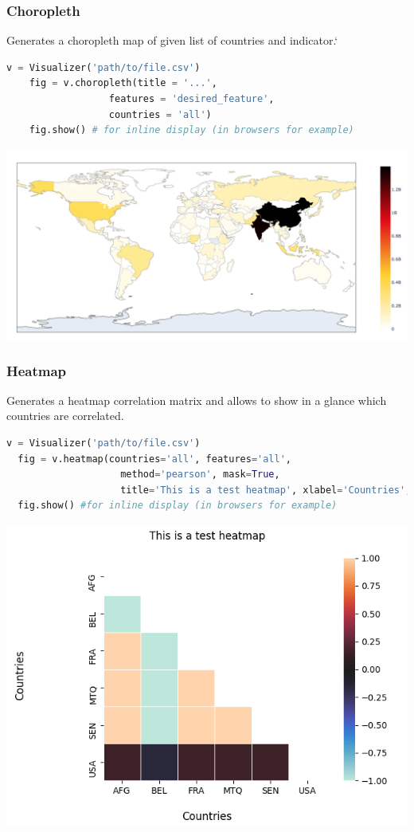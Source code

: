 \begin{frame}[fragile,shrink=30]
   \frametitle{Choropleth}
   Generates a choropleth map of given list of countries and indicator.`
   \begin{lstlisting}[language=Python]
    v = Visualizer('path/to/file.csv')
    fig = v.choropleth(title = '...',
                  features = 'desired_feature',
                  countries = 'all')
    fig.show() # for inline display (in browsers for example)
    \end{lstlisting}
    \begin{center}
        \includegraphics[scale=0.4]{beamer/inc/graphics/choropleth.png} 
    \end{center}
\end{frame}

\begin{frame}[fragile,shrink=30]
  \frametitle{Heatmap}
  Generates a heatmap correlation matrix and allows to show in a glance which countries are correlated.
  \begin{lstlisting}[language=Python]
  v = Visualizer('path/to/file.csv')
  fig = v.heatmap(countries='all', features='all',
                    method='pearson', mask=True,
                    title='This is a test heatmap', xlabel='Countries', ylabel='Countries')
  fig.show() #for inline display (in browsers for example)
  \end{lstlisting}
  \begin{center}
    \includegraphics[scale=0.6]{beamer/inc/graphics/heatmap.png}
    \end{center}
\end{frame}

